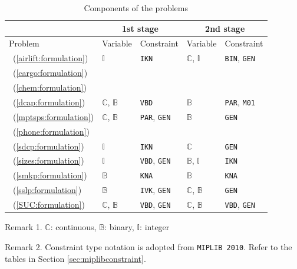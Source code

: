 \begin{table}[H]
	\centering
	\caption{Components of the problems}
	\label{table:prob_class}
	\begin{threeparttable}
		\begin{tabular}{@{}lllll@{}}
			\toprule
			& \multicolumn{2}{c}{1st stage}                              				  	& \multicolumn{2}{c}{2nd stage}                             			        \\ \midrule
			Problem 	     & Variable                    & Constraint                   	& Variable                    & Constraint                  				    \\ \midrule
			\airlift\ (\ref{airlift:formulation}) & $\mathbb{I}$ & \texttt{IKN}& $\mathbb{C}$, $\mathbb{I}$ & \texttt{BIN}, \texttt{GEN}\\
			\cargo\ (\ref{cargo:formulation}) &  & & & \\		
			\chem\ (\ref{chem:formulation}) &  & & & \\				
			\dcap\ (\ref{dcap:formulation})    & $\mathbb{C}$, $\mathbb{B}$  & \texttt{VBD}                	& $\mathbb{B}$                & \texttt{PAR}, \texttt{M01} 			    		\\
			\mptsps\ (\ref{mptsps:formulation})  & $\mathbb{C}$, $\mathbb{B}$  & \texttt{PAR}, \texttt{GEN}		& $\mathbb{B}$                & \texttt{GEN}               						\\
			\phone\ (\ref{phone:formulation}) &  & & & \\			
			\sdcp\ (\ref{sdcp:formulation}) & $\mathbb{I}$ & \texttt{IKN}& $\mathbb{C}$ & \texttt{GEN}\\
			\sizes\ (\ref{sizes:formulation})   & $\mathbb{I}$ 			   & \texttt{VBD}, \texttt{GEN} 	& $\mathbb{B}$, $\mathbb{I}$  & \texttt{IKN}             						\\
			\smkp\ (\ref{smkp:formulation})   & $\mathbb{B}$                & \texttt{KNA}                	& $\mathbb{B}$                & \texttt{KNA}              						\\
			\sslp\ (\ref{sslp:formulation})   & $\mathbb{B}$                & \texttt{IVK}, \texttt{GEN} 	& $\mathbb{C}$, $\mathbb{B}$  & \texttt{GEN}             						\\
			\suc\ (\ref{SUC:formulation})   & $\mathbb{C}$, $\mathbb{B}$                 & \texttt{VBD}, \texttt{GEN}                            	& $\mathbb{C}$, $\mathbb{B}$  &  \texttt{VBD}, \texttt{GEN}                                  					\\ \bottomrule
		\end{tabular}
		
		\begin{tablenotes}
			\small
			\item Remark 1. $\mathbb{C}$: continuous, $\mathbb{B}$: binary, $\mathbb{I}$: integer
			\item Remark 2. Constraint type notation is adopted from \texttt{MIPLIB 2010}. Refer to the tables in Section \ref{sec:miplibconstraint}.
		\end{tablenotes}
	\end{threeparttable}
\end{table}

